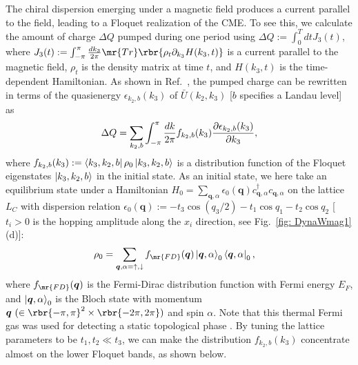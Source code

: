 \documentclass[
floatfix,
pra,
twocolumn,
reprint,
amsmath,amssymb,
aps,
footnote,
]{revtex4}
\begin{document}
The chiral dispersion emerging under a magnetic field produces a current parallel to the field, leading to a Floquet realization of the CME.
To see this, we calculate the amount of charge $\Delta Q$ pumped during one period using $\Delta Q := \int_0^T dt J_3(t)$, where $J_3(t):=\int_{-\pi}^\pi {dk_3 \over 2\pi}\mr{Tr}\rbr{\rho_t \partial_{k_3} H(k_3, t)}$ is a current parallel to the magnetic field, $\rho_t$ is the density matrix at time $t$, and $H(k_3,t)$ is the time-dependent Hamiltonian.
As shown in Ref.~\cite{Kitagawa10}, the pumped charge can be rewritten in terms of the quasienergy $\epsilon_{k_2,b}(k_3)$ of $\bar{U}(k_2,k_3)$ [$b$ specifies a Landau level] as
\begin{align}
	\Delta Q =
	\sum_{k_2, b}
	\int_{-\pi}^\pi {dk \over 2\pi}
	f_{k_2, b}(k_3) {\partial \epsilon_{k_2, b}(k_3) \over \partial k_3}
	, \label{eq: 2}
\end{align}
where $f_{k_2, b}(k_3) := \bra{k_3, k_2, b}\rho_0 \ket{k_3, k_2, b}$ is a distribution function of the Floquet eigenstates $\ket{k_3, k_2, b}$ in the initial state.
As an initial state, we here take an equilibrium state under a Hamiltonian $H_0 = \sum_{\bm{q}, \alpha}\epsilon_0(\bm{q})c_{\bm{q},\alpha}^\dagger c_{\bm{q},\alpha}$ on the lattice $L_C$ with dispersion relation $\epsilon_0(\bm{q}) := -t_3\cos(q_3/2)-t_1\cos q_1-t_2\cos q_2$ [$t_i>0$ is the hopping amplitude along the $x_i$ direction, see Fig.~\ref{fig: DynaWmag1} (d)]:
\begin{align}
	\rho_0 &= \sum_{\bm{q}, \alpha = \uparrow, \downarrow}
	f_{\mr{FD}}(\bm{q})
	\ket{\bm{q},\alpha}_0 \bra{\bm{q},\alpha}_0
	,
	\label{eq: fcme, 8}
\end{align}
where $f_{\mr{FD}}(\bm{q})$ is the Fermi-Dirac distribution function with Fermi energy $E_F$, and $\ket{\bm{q},\alpha}_0$ is the Bloch state with momentum $\bm{q} \ (\in \rbr{-\pi,\pi}^2\times \rbr{-2\pi, 2\pi})$ and spin $\alpha$.
Note that this thermal Fermi gas was used for detecting a static topological phase \cite{DauphinA13, RoyS16, RoyS18}. %
By tuning the lattice parameters to be $t_1,t_2 \ll t_3$, we can make the distribution $f_{k_2, b}(k_3)$ concentrate almost on the lower Floquet bands, as shown below.
\end{document}
